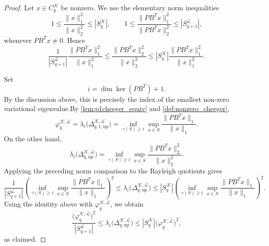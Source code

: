 \documentclass[10pt,a4paper]{amsart}
\newcommand{\KK}{\mathcal{K}}
\newcommand{\LL}{\mathcal{L}}
\begin{document}
\begin{proof}
Let \(x\in C_q^\KK\) be nonzero. We use the elementary norm inequalities
\[
1\leq \frac{\|x\|_1^2}{\|x\|_2^2}\leq |S_q^\KK|,
\qquad
1\leq
\frac{\|PB^T x\|_1^2}{\|PB^T x\|_2^2}
\leq |S_{q+1}^{\LL}|,
\]
whenever \(PB^T x\neq 0\). Hence
\[
\frac{1}{|S_{q+1}^{\LL}|}
\frac{\|PB^T x\|_1^2}{\|x\|_1^2}
\leq
\frac{\|PB^T x\|_2^2}{\|x\|_2^2}
\leq
|S_q^\KK|
\frac{\|PB^T x\|_1^2}{\|x\|_1^2}.
\]

Set
\[
i=\dim\ker(PB^T)+1.
\]
By the discussion above, this is precisely the index of the smallest non-zero variational eigenvalue.By \cref{lem:p1cheeger_equiv} and \cref{def:nonzero_cheeger},
\[
\varphi_q^{\KK,\LL}
=
\lambda_i\bigl(\Delta_{q,1,\mathrm{up}}^{\KK,\LL}\bigr)
=
\inf_{\gamma(S)\geq i}
\sup_{x\in S}
\frac{\|PB^T x\|_1}{\|x\|_1}.
\]
On the other hand,
\[
\lambda_i\bigl(\Delta_{q,\mathrm{up}}^{\KK,\LL}\bigr)
=
\inf_{\gamma(S)\geq i}
\sup_{x\in S}
\frac{\|PB^T x\|_2^2}{\|x\|_2^2}.
\]
Applying the preceding norm comparison to the Rayleigh quotients gives
\[
\frac{1}{|S_{q+1}^{\LL}|}
\left(
\inf_{\gamma(S)\geq i}
\sup_{x\in S}
\frac{\|PB^T x\|_1}{\|x\|_1}
\right)^2
\leq
\lambda_i\bigl(\Delta_{q,\mathrm{up}}^{\KK,\LL}\bigr)
\leq
|S_q^\KK|
\left(
\inf_{\gamma(S)\geq i}
\sup_{x\in S}
\frac{\|PB^T x\|_1}{\|x\|_1}
\right)^2.
\]
Using the identity above with \(\varphi_q^{\KK,\LL}\), we obtain
\[
\frac{\bigl(\varphi_q^{\KK,\LL}\bigr)^2}{|S_{q+1}^{\LL}|}
\leq
\lambda_i\bigl(\Delta_{q,\mathrm{up}}^{\KK,\LL}\bigr)
\leq
|S_q^\KK|\bigl(\varphi_q^{\KK,\LL}\bigr)^2,
\]
as claimed.
\end{proof}
\end{document}
